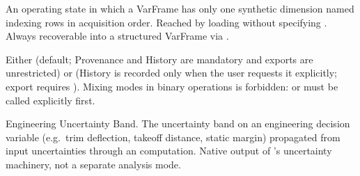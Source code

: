 \begin{description}[style=nextline,leftmargin=0pt]
\item[datapoint mode]
An operating state in which a VarFrame has only one synthetic dimension
named  indexing rows in acquisition order. Reached by loading
without specifying . Always recoverable into a structured VarFrame
via .

\item[operating mode]
Either  (default; Provenance and History are mandatory and
exports are unrestricted) or  (History is recorded only when the
user requests it explicitly; export requires ). Mixing
modes in binary operations is forbidden:  or
 must be called explicitly first.

\item[EUB]
Engineering Uncertainty Band. The uncertainty band on an engineering decision
variable (e.g.\ trim deflection, takeoff distance, static margin) propagated
from input uncertainties through an  computation. Native
output of \itc{}'s uncertainty machinery, not a separate analysis mode.

\end{description}

\clearpage
